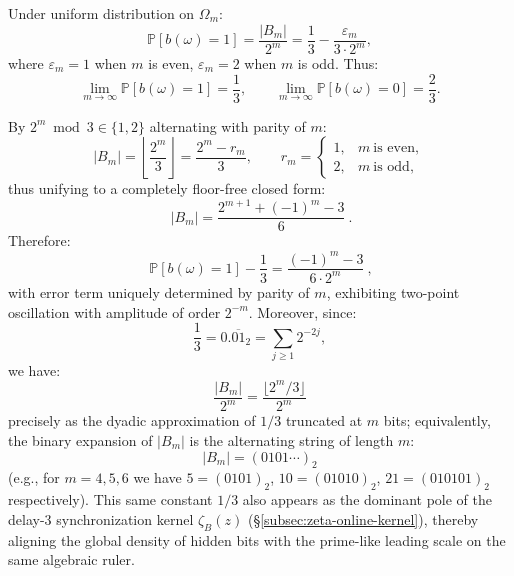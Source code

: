 \begin{corollary}\label{cor:pom-hidden-bit-entropy}
Under uniform distribution on $\Omega_m$:
$$
\mathbb{P}[b(\omega)=1]=\frac{|B_m|}{2^m}
=\frac{1}{3}-\frac{\varepsilon_m}{3\cdot 2^m},
$$
where $\varepsilon_m=1$ when $m$ is even, $\varepsilon_m=2$ when $m$ is odd. Thus:
$$
\lim_{m\to\infty}\mathbb{P}[b(\omega)=1]=\frac{1}{3},\qquad
\lim_{m\to\infty}\mathbb{P}[b(\omega)=0]=\frac{2}{3}.
$$
\end{corollary}

\begin{remark}\label{rem:pom-hidden-bit-dyadic-trunc}
By $2^m\bmod 3\in\{1,2\}$ alternating with parity of $m$:
\[
|B_m|
=\left\lfloor\frac{2^m}{3}\right\rfloor
=\frac{2^m-r_m}{3},
\qquad
r_m=
\begin{cases}
1,& m\ \text{is even},\\
2,& m\ \text{is odd},
\end{cases}
\]
thus unifying to a completely floor-free closed form:
\[
\boxed{\ |B_m|=\frac{2^{m+1}+(-1)^m-3}{6}\ }.
\]
Therefore:
\[
\boxed{\ \mathbb{P}[b(\omega)=1]-\frac13=\frac{(-1)^m-3}{6\cdot 2^m}\ },
\]
with error term uniquely determined by parity of $m$, exhibiting two-point oscillation with amplitude of order $2^{-m}$.
Moreover, since:
\[
\frac13=0.\overline{01}_2=\sum_{j\ge 1}2^{-2j},
\]
we have:
\[
\frac{|B_m|}{2^m}=\frac{\lfloor 2^m/3\rfloor}{2^m}
\]
precisely as the dyadic approximation of $1/3$ truncated at $m$ bits; equivalently, the binary expansion of $|B_m|$ is the alternating string of length $m$:
\[
|B_m|=(0101\cdots)_2
\]
(e.g., for $m=4,5,6$ we have $5=(0101)_2$, $10=(01010)_2$, $21=(010101)_2$ respectively).
This same constant $1/3$ also appears as the dominant pole of the delay-$3$ synchronization kernel $\zeta_B(z)$ (\S\ref{subsec:zeta-online-kernel}), thereby aligning the global density of hidden bits with the prime-like leading scale on the same algebraic ruler.
\end{remark}

